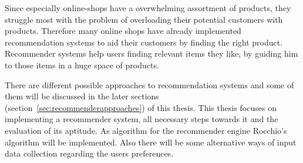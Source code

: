 Since especially online-shops have a overwhelming assortment of products, they struggle most with the problem of overloading their potential customers with products.
Therefore many online shops have already implemented recommendation systems to aid their customers by finding the right product.
Recommender systems help users finding relevant items they like, by guiding him to those items in a huge space of products.\citep[p.~63]{bollen:2010}


There are different possible approaches to recommendation systems and some of them will be discussed in the later sections (section~\ref{sec:recommenderapproaches}) of this thesis.
This thesis focuses on implementing a recommender system, all necessary steps towards it and the evaluation of its aptitude.
As algorithm for the recommender engine Rocchio's algorithm will be implemented.
Also there will be some alternative ways of input data collection regarding the users preferences.



